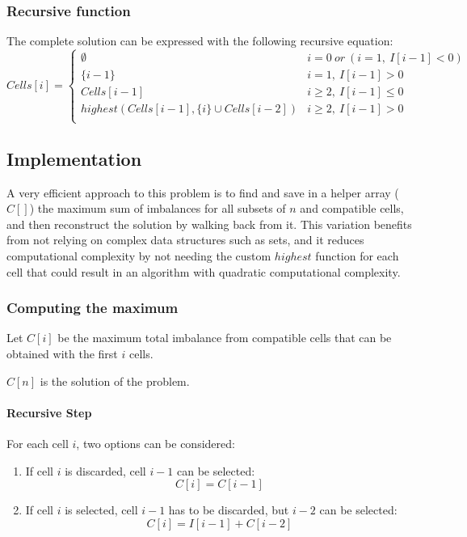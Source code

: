 \subsubsection{Recursive function}
The complete solution can be expressed with the following recursive equation:
\[
    Cells[i] = \begin{cases}
        \emptyset                                           & i=0\ or\ (i=1,\ I[i-1]<0) \\
        \{i-1\}                                             & i=1, \ I[i-1] > 0         \\
        Cells[i-1]                                          & i \ge 2,\ I[i-1] \leq 0   \\
        \mathit{highest}(Cells[i-1], \{i\} \cup Cells[i-2]) & i \ge 2,\ I[i-1] > 0      \\
    \end{cases}
\]

\subsection{Implementation}

A very efficient approach to this problem is to find and save in a helper array ($C[]$) the maximum sum of imbalances for all subsets of $n$ and compatible cells, and then reconstruct the solution by walking back from it. This variation benefits from not relying on complex data structures such as sets, and it reduces computational complexity by not needing the custom $\mathit{highest}$ function for each cell that could result in an algorithm with quadratic computational complexity.

\subsubsection{Computing the maximum}
Let $C[i]$ be the maximum total imbalance from compatible cells that can be obtained with the first $i$ cells.

$C[n]$ is the solution of the problem.

\paragraph{Recursive Step}

For each cell $i$, two options can be considered:
\begin{enumerate}
    \item If cell $i$ is discarded, cell $i-1$ can be selected:
          \[
              C[i]=C[i-1]
          \]

    \item If cell $i$ is selected, cell $i-1$ has to be discarded, but $i-2$ can be selected:
          \[
              C[i]=I[i-1]+C[i-2]
          \]
\end{enumerate}

